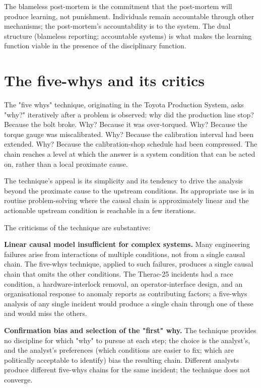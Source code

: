 \begin{principle}
The blameless post-mortem is the commitment that the post-mortem will produce learning, not punishment. Individuals remain accountable through other mechanisms; the post-mortem's accountability is to the system. The dual structure (blameless reporting; accountable systems) is what makes the learning function viable in the presence of the disciplinary function.
\end{principle}

\section{The five-whys and its critics}

The "five whys" technique, originating in the Toyota Production System, asks "why?" iteratively after a problem is observed: why did the production line stop? Because the bolt broke. Why? Because it was over-torqued. Why? Because the torque gauge was miscalibrated. Why? Because the calibration interval had been extended. Why? Because the calibration-shop schedule had been compressed. The chain reaches a level at which the answer is a system condition that can be acted on, rather than a local proximate cause.

The technique's appeal is its simplicity and its tendency to drive the analysis beyond the proximate cause to the upstream conditions. Its appropriate use is in routine problem-solving where the causal chain is approximately linear and the actionable upstream condition is reachable in a few iterations.

The criticisms of the technique are substantive:

\textbf{Linear causal model insufficient for complex systems.} Many engineering failures arise from interactions of multiple conditions, not from a single causal chain. The five-whys technique, applied to such failures, produces a single causal chain that omits the other conditions. The Therac-25 incidents had a race condition, a hardware-interlock removal, an operator-interface design, and an organisational response to anomaly reports as contributing factors; a five-whys analysis of any single incident would produce a single chain through one of these and would miss the others.

\textbf{Confirmation bias and selection of the "first" why.} The technique provides no discipline for which "why" to pursue at each step; the choice is the analyst's, and the analyst's preferences (which conditions are easier to fix; which are politically acceptable to identify) bias the resulting chain. Different analysts produce different five-whys chains for the same incident; the technique does not converge.

